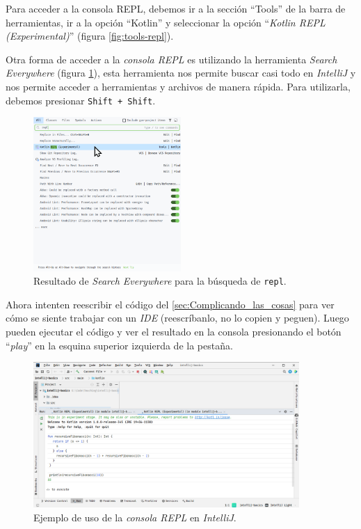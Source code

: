     Para acceder a la consola REPL, debemos ir a la sección \enquote{Tools} de la barra de 
    herramientas, ir a la opción \enquote{Kotlin} y seleccionar la opción \enquote{\textit{Kotlin REPL 
    (Experimental)}} (figura \ref{fig:tools-repl}).
    
    \begin{tcolorbox}[enhanced, breakable, title=\textit{Search Everywere}]
      Otra forma de acceder a la \textit{consola REPL} es utilizando la herramienta \textit{Search
      Everywhere} (figura \ref{fig:idea64-search-everywhere}), esta herramienta nos permite buscar
      casi todo en \textit{IntelliJ} y nos permite acceder a herramientas y archivos de manera 
      rápida.
      Para utilizarla, debemos presionar \texttt{Shift + Shift}.
    \end{tcolorbox}
    
    \begin{figure}[ht!]
      \centering
      \includegraphics[width=0.5\textwidth]{img/Por_algo_se_empieza/idea64_search_everywhere.png}
      \caption{Resultado de \textit{Search Everywhere} para la búsqueda de \texttt{repl}.}
      \label{fig:idea64-search-everywhere}
    \end{figure}

    Ahora intenten reescribir el código del \cref{sec:Complicando_las_cosas} para ver cómo se siente 
    trabajar con un \textit{IDE} (reescríbanlo, no lo copien y peguen).
    Luego pueden ejecutar el código y ver el resultado en la consola presionando el botón 
    \enquote{\textit{play}} en la esquina superior izquierda de la pestaña.
    
    \begin{figure}[ht!]
      \centering
      \includegraphics[width=0.9\textwidth]{img/Por_algo_se_empieza/idea64_fibonacci_repl.png}
      \caption{Ejemplo de uso de la \textit{consola REPL} en \textit{IntelliJ}.}
      \label{fig:idea64-fibonacci-repl}
    \end{figure}
